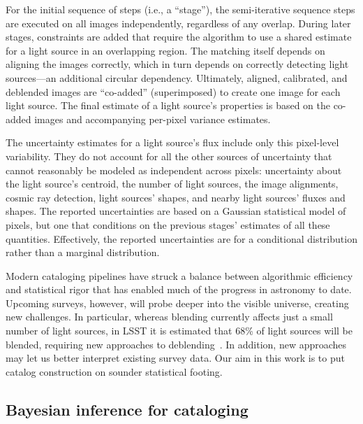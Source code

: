 For the initial sequence of steps (i.e., a ``stage''), the semi-iterative sequence steps are executed on all images independently,
regardless of any overlap.
During later stages, constraints are added that require the algorithm to use a shared estimate for a light source in an overlapping region.
The matching itself depends on aligning the images correctly, which in turn depends on correctly detecting light sources---an additional circular dependency.
Ultimately, aligned, calibrated, and deblended images are ``co-added'' (superimposed) to create one image for each light source.
The final estimate of a light source's properties is based on
the co-added images and accompanying per-pixel variance estimates.

The uncertainty estimates for a light source's flux include only this pixel-level variability.
They do not account for all the other sources of uncertainty that cannot reasonably be modeled as independent across pixels: uncertainty about the light source's centroid, the number of light sources, the image alignments, cosmic ray detection, light sources' shapes, and nearby light sources' fluxes and shapes. The reported uncertainties are based on a Gaussian statistical model of pixels, but one that conditions on the previous stages' estimates of all these quantities.
Effectively, the reported uncertainties are for a conditional distribution rather than a marginal distribution.

Modern cataloging pipelines have struck a balance between algorithmic efficiency and statistical rigor
that has enabled much of the progress in astronomy to date.
Upcoming surveys, however, will probe deeper into the visible universe, creating new challenges.
In particular, whereas blending currently affects just a small number of light sources,
in LSST it is estimated that 68\% of light sources will be blended, requiring new approaches to deblending~\citep{bosch2018hyper}.
In addition, new approaches may let us better interpret existing survey data.
Our aim in this work is to put catalog construction on sounder statistical footing.



\subsection*{Bayesian inference for cataloging}

